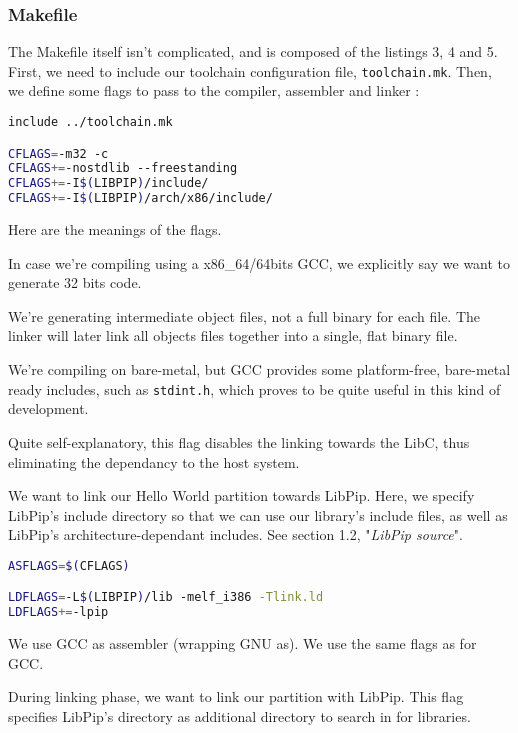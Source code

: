 \documentclass[10pt,a4paper,titlepage]{refart}
\begin{document}
\subsubsection{Makefile}
The Makefile itself isn't complicated, and is composed of the listings 3, 4 and 5. First, we need to include our toolchain configuration file, \texttt{toolchain.mk}. Then, we define some flags to pass to the compiler, assembler and linker :
 \begin{lstlisting}[language=bash,caption={Makefile GCC flags}]
include ../toolchain.mk

CFLAGS=-m32 -c
CFLAGS+=-nostdlib --freestanding
CFLAGS+=-I$(LIBPIP)/include/
CFLAGS+=-I$(LIBPIP)/arch/x86/include/
\end{lstlisting}

Here are the meanings of the flags. 

In case we're compiling using a x86\_64/64bits GCC, we explicitly say we want to generate 32 bits code.

We're generating intermediate object files, not a full binary for each file. The linker will later link all objects files together into a single, flat binary file.

We're compiling on bare-metal, but GCC provides some platform-free, bare-metal ready includes, such as \texttt{stdint.h}, which proves to be quite useful in this kind of development. 

Quite self-explanatory, this flag disables the linking towards the LibC, thus eliminating the dependancy to the host system.

We want to link our Hello World partition towards LibPip. Here, we specify LibPip's include directory so that we can use our library's include files, as well as LibPip's architecture-dependant includes. See section 1.2, "\textit{LibPip source}".

\begin{lstlisting}[language=bash,caption={Makefile GAS and LD flags}]
ASFLAGS=$(CFLAGS)

LDFLAGS=-L$(LIBPIP)/lib -melf_i386 -Tlink.ld
LDFLAGS+=-lpip
\end{lstlisting}

We use GCC as assembler (wrapping GNU as). We use the same flags as for GCC.

During linking phase, we want to link our partition with LibPip. This flag specifies LibPip's directory as additional directory to search in for libraries.
\end{document}
